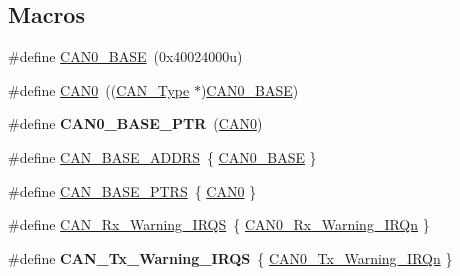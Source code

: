\subsection*{Macros}
\begin{DoxyCompactItemize}
\item 
\#define \hyperlink{group__CAN__Peripheral__Access__Layer_gaf28059909d16b304a2d26930aac760fd}{C\+A\+N0\+\_\+\+B\+A\+SE}~(0x40024000u)
\item 
\#define \hyperlink{group__CAN__Peripheral__Access__Layer_ga8882ee5d18ec64b8193396ec6bc66fe5}{C\+A\+N0}~((\hyperlink{structCAN__Type}{C\+A\+N\+\_\+\+Type} $\ast$)\hyperlink{group__CAN__Peripheral__Access__Layer_gaf28059909d16b304a2d26930aac760fd}{C\+A\+N0\+\_\+\+B\+A\+SE})
\item 
\#define {\bfseries C\+A\+N0\+\_\+\+B\+A\+S\+E\+\_\+\+P\+TR}~(\hyperlink{group__CAN__Peripheral__Access__Layer_ga8882ee5d18ec64b8193396ec6bc66fe5}{C\+A\+N0})\hypertarget{group__CAN__Peripheral__Access__Layer_ga1ee8f499e10af9b8e3132e0168e519b9}{}\label{group__CAN__Peripheral__Access__Layer_ga1ee8f499e10af9b8e3132e0168e519b9}

\item 
\#define \hyperlink{group__CAN__Peripheral__Access__Layer_gae13d94ba45c7672726f65ae76ba7242d}{C\+A\+N\+\_\+\+B\+A\+S\+E\+\_\+\+A\+D\+D\+RS}~\{ \hyperlink{group__CAN__Peripheral__Access__Layer_gaf28059909d16b304a2d26930aac760fd}{C\+A\+N0\+\_\+\+B\+A\+SE} \}
\item 
\#define \hyperlink{group__CAN__Peripheral__Access__Layer_gaf9ce8b815aacb2022a8a7454f4028a6c}{C\+A\+N\+\_\+\+B\+A\+S\+E\+\_\+\+P\+T\+RS}~\{ \hyperlink{group__CAN__Peripheral__Access__Layer_ga8882ee5d18ec64b8193396ec6bc66fe5}{C\+A\+N0} \}
\item 
\#define \hyperlink{group__CAN__Peripheral__Access__Layer_ga5609c3f62c9fe288c8362a6e1948375e}{C\+A\+N\+\_\+\+Rx\+\_\+\+Warning\+\_\+\+I\+R\+QS}~\{ \hyperlink{group__Interrupt__vector__numbers_gga666eb0caeb12ec0e281415592ae89083ab1adc8de178aff59fbb04bd25190847b}{C\+A\+N0\+\_\+\+Rx\+\_\+\+Warning\+\_\+\+I\+R\+Qn} \}
\item 
\#define {\bfseries C\+A\+N\+\_\+\+Tx\+\_\+\+Warning\+\_\+\+I\+R\+QS}~\{ \hyperlink{group__Interrupt__vector__numbers_gga666eb0caeb12ec0e281415592ae89083a4e54a0487cda10afe462f184840c24ba}{C\+A\+N0\+\_\+\+Tx\+\_\+\+Warning\+\_\+\+I\+R\+Qn} \}\hypertarget{group__CAN__Peripheral__Access__Layer_ga4e858b19eac173235a4e58b2a3e69f3c}{}\label{group__CAN__Peripheral__Access__Layer_ga4e858b19eac173235a4e58b2a3e69f3c}


\end{DoxyCompactItemize}
